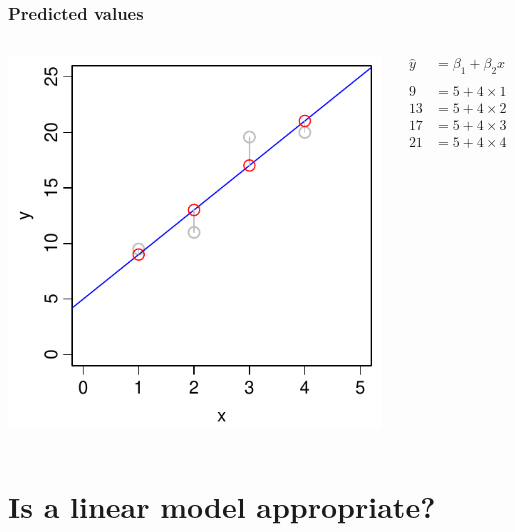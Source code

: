 \documentclass[aspectratio=43]{beamer}
\begin{document}
\frame
{\frametitle{Predicted values}

\begin{columns}[T]

		\includegraphics[width=\textwidth]{Predicted.pdf}
		
		\begin{align*}
		  \hat{y}  &= \beta_1 + \beta_2 x  \\
		  \\
		  9  &= 5 + 4 \times 1 \\
		  13 &= 5 + 4 \times 2 \\
		  17 &= 5 + 4 \times 3 \\
		  21 &= 5 + 4 \times 4  
		\end{align*}
\end{columns}		
}

\section{Is a linear model appropriate?}
\end{document}
